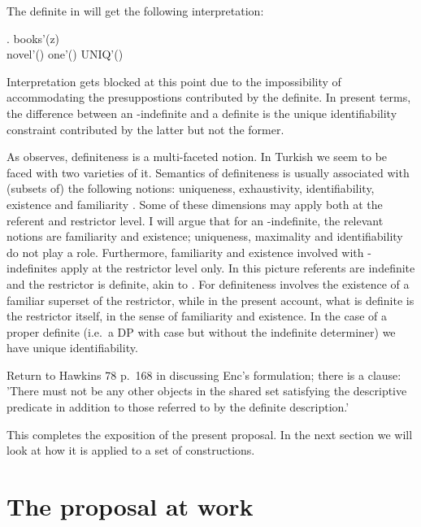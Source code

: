 \documentclass[11pt,a4paper]{article}
\begin{document}
The definite in  will get the following
interpretation:

\ex.
{
		books'(z)\\
		novel'() \quad one'() \quad UNIQ'() 
}

Interpretation gets blocked at this point due to the impossibility of
accommodating the presuppostions contributed by the definite. In
present terms, the difference between an \acc-indefinite and a
definite is the unique identifiability constraint contributed by the
latter but not the former.

As \cite{lyons99} observes, definiteness is a multi-faceted notion. In
Turkish we seem to be faced with two varieties of it.  Semantics of
definiteness is usually associated with (subsets of) the following
notions: uniqueness, exhaustivity, identifiability, existence and
familiarity . Some of these dimensions may
apply both at the referent and restrictor level. I will argue that for
an \acc-indefinite, the relevant notions are familiarity and
existence; uniqueness, maximality and identifiability do not play a
role. Furthermore, familiarity and existence involved with
\acc-indefinites apply at the restrictor level only. In this picture
referents are indefinite and the restrictor is definite, akin to
. For  definiteness involves the existence of
a familiar superset of the restrictor, while in the present account,
what is definite is the restrictor itself, in the sense of familiarity
and existence. In the case of a proper definite (i.e.\ a DP with case
but without the indefinite determiner) we have unique identifiability.

Return to Hawkins 78 p.\ 168 in discussing Enc's formulation; there is a clause:
'There must not be any other objects in the shared set satisfying the
descriptive predicate in addition to those referred to by the definite
description.'




This completes the exposition of the present proposal. In the next
section we will look at how it is applied to a set of constructions.



\section{The proposal at work}
\end{document}
